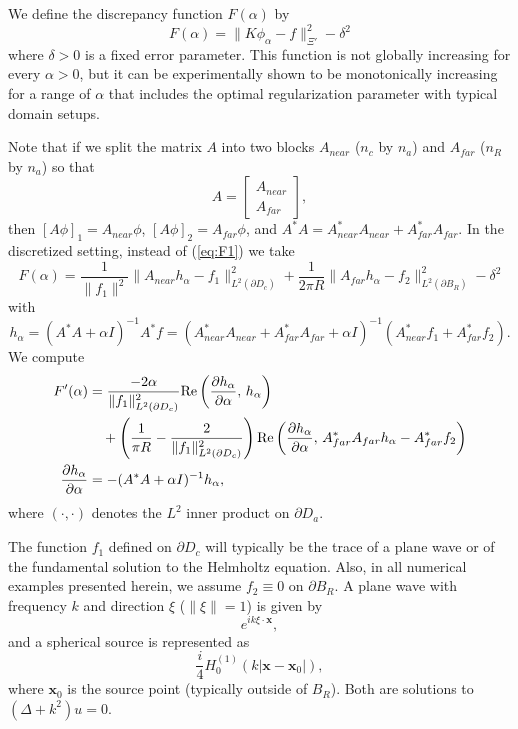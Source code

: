 \documentclass[11pt]{amsart}
\theoremstyle{definition}
\theoremstyle{definition}
\theoremstyle{definition}
\newcommand{\paren}[1]{\left ( #1\right )}
\newcommand{\re}{\textrm{Re}}
\begin{document}
We define the discrepancy function $F(\alpha)$ by
\begin{equation}
F(\alpha) = \|K\phi_{\alpha} - f\|_{\Xi'}^{2} - \delta^{2} \label{eq:F}
\end{equation}
where $\delta > 0$ is a fixed error parameter. This function is not globally increasing for every $\alpha > 0$, but it can be experimentally shown to be monotonically increasing for a range of $\alpha$ that includes the optimal regularization parameter with typical domain setups.

Note that if we split the matrix $A$ into two blocks $A_{near}$ ($n_{c}$ by $n_{a}$) and $A_{far}$ ($n_{R}$ by $n_{a}$) so that
\begin{equation*}
A = \left[ \begin{array}{c}
A_{near}\\
A_{far}
\end{array}\right],
\end{equation*}
then $[A\phi]_{1} = A_{near}\phi$, $[A\phi]_{2} = A_{far}\phi$, and $A^{*}A = A_{near}^{*}A_{near} + A_{far}^{*}A_{far}$. In the discretized setting, instead of (\ref{eq:F1}) we take
\begin{equation}
F(\alpha) =\frac{1}{\|f_{1}\|^{2}} \|A_{near}h_{\alpha} - f_{1}\|_{L^{2}(\partial D_{c})}^{2} + \frac{1}{2\pi R}\|A_{far}h_{\alpha} - f_{2}\|_{L^{2}(\partial B_{R})}^{2} - \delta^{2}
\end{equation}
with
\begin{equation}
h_{\alpha} = (A^{*}A + \alpha I)^{-1}A^{*}f = (A_{near}^{*}A_{near} + A_{far}^{*}A_{far} + \alpha I)^{-1}\paren{A_{near}^{*}f_{1} + A_{far}^{*}f_{2}}.
\end{equation}
We compute
\begin{align}
F'(\alpha) & = \frac{-2\alpha}{\|f_{1}\|_{L^{2}(\partial D_{c})}^{2}}\re\paren{\frac{\partial h_{\alpha}}{\partial \alpha}, \, h_{\alpha}} \notag\\
& \quad + \paren{ \frac{1}{\pi R} - \frac{2}{\|f_{1}\|_{L^{2}(\partial D_{c})}^{2}}}\re\paren{\frac{\partial h_{\alpha}}{\partial \alpha}, \, A_{far}^{*}A_{far}h_{\alpha} - A_{far}^{*}f_{2}} \label{eq:dF1}\\
\frac{\partial h_{\alpha}}{\partial \alpha} & = -(A^{*}A + \alpha I)^{-1}h_{\alpha}, \label{eq:dF2}
\end{align}
where $( \cdot, \cdot )$ denotes the $L^{2}$ inner product on $\partial D_{a}$.

The function $f_{1}$ defined on $\partial D_{c}$ will typically be the trace of a plane wave or of the fundamental solution to the Helmholtz equation. Also, in all numerical examples presented herein, we assume $f_{2} \equiv 0$ on $\partial B_{R}$. A plane wave with frequency $k$ and direction $\xi$ ($\|\xi\| = 1$) is given by
\begin{equation}
e^{ik\xi \cdot \mathbf{x}}, \label{eq:planewavesol}
\end{equation}
and a spherical source is represented as
\begin{equation}
\frac{i}{4}H_{0}^{(1)}(k|\mathbf{x} - \mathbf{x}_{0}|), \label{eq:sphericalsource}
\end{equation}
where $\mathbf{x}_{0}$ is the source point (typically outside of $B_{R}$). Both are solutions to $(\Delta + k^{2})u = 0$.
\end{document}
